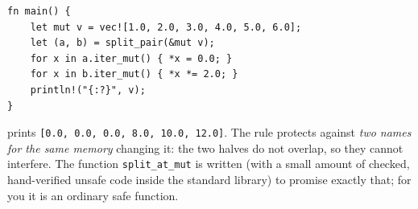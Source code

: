 \begin{enumerate}[label=\textbf{\ansnum.\arabic*}]
\begin{verbatim}
fn main() {
    let mut v = vec![1.0, 2.0, 3.0, 4.0, 5.0, 6.0];
    let (a, b) = split_pair(&mut v);
    for x in a.iter_mut() { *x = 0.0; }
    for x in b.iter_mut() { *x *= 2.0; }
    println!("{:?}", v);
}
\end{verbatim}
prints \verb![0.0, 0.0, 0.0, 8.0, 10.0, 12.0]!. The rule protects against \emph{two names for the same memory} changing it: the two halves do not overlap, so they cannot interfere. The function \verb!split_at_mut! is written (with a small amount of checked, hand-verified unsafe code inside the standard library) to promise exactly that; for you it is an ordinary safe function.
\end{enumerate}
